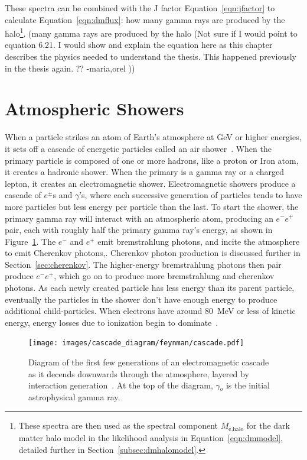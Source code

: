     These spectra can be combined with the J factor Equation~\ref{eqn:jfactor} to calculate Equation~\ref{eqn:dmflux}: how many gamma rays are produced by the halo\footnote{
      These spectra are then used as the spectral component $M_{\textrm{e,halo}}$ for the dark matter halo model in the likelihood analysis in Equation~\ref{eqn:dmmodel}, detailed further in Section~\ref{subsec:dmhalomodel}.
    }.
    {\color{red}(many gamma rays are produced by the halo (Not sure if I would point to equation 6.21. I would show and explain the equation here as this chapter describes the physics needed to understand the thesis. This happened previously in the thesis again. ?? -maria,orel ))}

    \FloatBarrier
    
    
\section{Atmospheric Showers}

  When a particle strikes an atom of Earth's atmosphere at GeV or higher energies, it sets off a cascade of energetic particles called an air shower~\cite{Bethe1934,Klein1999}.
  When the primary particle is composed of one or more hadrons, like a proton or Iron atom, it creates a hadronic shower.
  When the primary is a gamma ray or a charged lepton, it creates an electromagnetic shower.
  Electromagnetic showers produce a cascade of $e^{\pm}$s and $\gamma$'s, where each successive generation of particles tends to have more particles but less energy per particle than the last.
  To start the shower, the primary gamma ray will interact with an atmospheric atom, producing an $e^{-}e^{+}$ pair, each with roughly half the primary gamma ray's energy, as shown in Figure~\ref{fig:emcascade}.
  The $e^{-}$ and $e^{+}$ emit bremstrahlung photons, and incite the atmosphere to emit Cherenkov photons,.
  Cherenkov photon production is discussed further in Section~\ref{sec:cherenkov}.
  The higher-energy bremstrahlung photons then pair produce $e^{-}e^{+}$, which go on to produce more bremstrahlung and cherenkov photons.
  As each newly created particle has less energy than its parent particle, eventually the particles in the shower don't have enough energy to produce additional child-particles.
  When electrons have around \SI{80}{MeV} or less of kinetic energy, energy losses due to ionization begin to dominate~\cite{pdg_2014}.

  \begin{figure}[ht]
    \centering
    \texttt{[image: images/cascade\_diagram/feynman/cascade.pdf]}
    \caption[Electromagnetic Cascade]{
      Diagram of the first few generations of an electromagnetic cascade as it decends downwards through the atmosphere, layered by interaction generation~\cite{ellis2017tikz}.
      At the top of the diagram, $\gamma{}_o$ is the initial astrophysical gamma ray.
      \CaptionBlankLine
    }
    \label{fig:emcascade}
  \end{figure}

